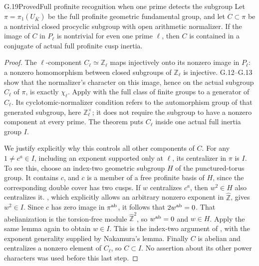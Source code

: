 \begin{statement}{G.19}{Proved}{Full profinite recognition when one prime detects the subgroup}
Let $\pi=\pi_1(U_{\overline K})$ be the full profinite geometric
fundamental group, and let $C\subset\pi$ be a nontrivial closed
procyclic subgroup with open arithmetic normalizer. If the image of
$C$ in $P_\ell$ is nontrivial for even one prime $\ell$, then $C$
is contained in a conjugate of actual full profinite cusp inertia.
\end{statement}
\begin{proof}
The $\ell$-component $C_\ell\simeq\mathbb Z_\ell$ maps injectively
onto its nonzero image in $P_\ell$: a nonzero homomorphism between
closed subgroups of $\mathbb Z_\ell$ is injective. G.12--G.13 show
that the normalizer's character on this image, hence on the actual
subgroup $C_\ell$ of $\pi$, is exactly $\chi_\ell$. Apply
\citet[Theorem 2.1.1]{Nakamura1994} with the full class of finite
groups to a generator of $C_\ell$. Its cyclotomic-normalizer
condition refers to the automorphism group of that generated
subgroup, here $\mathbb Z_\ell^\times$; it does not require the
subgroup to have a nonzero component at every prime. The theorem
puts $C_\ell$ inside one actual full inertia group $I$.

We justify explicitly why this controls all other components of
$C$. For any $1\ne c^a\in I$, including an exponent supported
only at $\ell$, its centralizer in $\pi$ is $I$. To see this,
choose an index-two geometric subgroup $H$ of the punctured-torus
group. It contains $c$, and $c$ is a member of a free profinite
basis of $H$, since the corresponding double cover has two
cusps. If $w$ centralizes $c^a$, then $w^2\in H$ also centralizes
it. \citet[Lemma 2.1.2]{Nakamura1994}, which explicitly allows
an arbitrary nonzero exponent in $\widehat{\mathbb Z}$, gives
$w^2\in I$. Since $c$ has zero image in $\pi^{\rm ab}$, it
follows that $2w^{\rm ab}=0$. That abelianization is the
torsion-free module $\widehat{\mathbb Z}^2$, so $w^{\rm ab}=0$
and $w\in H$. Apply the same lemma again to obtain $w\in I$.
This is the index-two argument of
\citet[\S1.3, Lemma 1]{Asada2001}, with the exponent generality
supplied by Nakamura's lemma. Finally $C$ is abelian and centralizes
a nonzero element of $C_\ell$, so $C\subset I$. No assertion
about its other power characters was used before this last step.
\end{proof}

